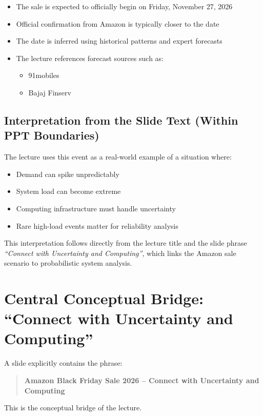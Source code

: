 \documentclass[11pt]{article}
\begin{document}
\begin{itemize}
    \item The sale is expected to officially begin on Friday, November 27, 2026
    \item Official confirmation from Amazon is typically closer to the date
    \item The date is inferred using historical patterns and expert forecasts
    \item The lecture references forecast sources such as:
    \begin{itemize}
        \item 91mobiles
        \item Bajaj Finserv
    \end{itemize}
\end{itemize}

\subsection*{Interpretation from the Slide Text (Within PPT Boundaries)}

The lecture uses this event as a real-world example of a situation where:

\begin{itemize}
    \item Demand can spike unpredictably
    \item System load can become extreme
    \item Computing infrastructure must handle uncertainty
    \item Rare high-load events matter for reliability analysis
\end{itemize}

This interpretation follows directly from the lecture title and the slide phrase \textit{``Connect with Uncertainty and Computing''}, which links the Amazon sale scenario to probabilistic system analysis.

\section{Central Conceptual Bridge: ``Connect with Uncertainty and Computing''}

A slide explicitly contains the phrase:

\begin{quote}
\textbf{Amazon Black Friday Sale 2026 -- Connect with Uncertainty and Computing}
\end{quote}

This is the conceptual bridge of the lecture.
\end{document}
